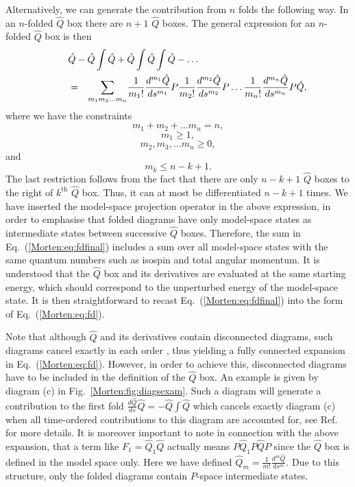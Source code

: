 Alternatively, we can generate the contribution
from $n$ folds the following way. In
an $n$-folded $\hat{Q}$ box there are $n+1$ $\hat{Q}$ boxes. The 
general expression for an $n$-folded $\hat{Q}$ box is then
\begin{eqnarray}
\lefteqn{        \hat{Q}   -\hat{Q}\int\hat{Q} 
    +\hat{Q}\int\hat{Q}\int\hat{Q} -\dots}\nonumber\\
\qquad&=&
    {\displaystyle\sum_{m_1m_2\dots m_n}}
    \frac{1}{m_1!}\frac{d^{m_1}\hat{Q}}{ds^{m_1}}P
    \frac{1}{m_2!}\frac{d^{m_2}\hat{Q}}{ds^{m_2}}P
    \dots
    \frac{1}{m_n!}\frac{d^{m_n}\hat{Q}}{ds^{m_n}}P\hat{Q},
\label{Morten:eq:fdfinal}
\end{eqnarray}
where we have the constraints
\[
  m_1+m_2+\dots m_n=n,
\]
\[
m_1\geq 1,
\]
\[
m_2, m_3, \dots m_n \geq 0,
\]
and
\[
m_k \leq n-k+1.
\]
The last restriction follows from the fact that there are only $n-k+1$
$\hat{Q}$ boxes to the right of $k^{\mathrm{th}}$ $\hat{Q}$ box.
Thus, it can at most be differentiated $n-k+1$ times.  We have
inserted the model-space projection operator in the above expression,
in order to emphasise that folded diagrams have only model-space
states as intermediate states between successive $\hat{Q}$
boxes. Therefore, the sum in Eq.~(\ref{Morten:eq:fdfinal}) includes a
sum over all model-space states with the same quantum numbers such as
isospin and total angular momentum. It is understood that the
$\hat{Q}$ box and its derivatives are evaluated at the same starting
energy, which should correspond to the unperturbed energy of the
model-space state.  It is then straightforward to recast
Eq.~(\ref{Morten:eq:fdfinal}) into the form of
Eq.~(\ref{Morten:eq:fd}).

Note that although $\hat{Q}$ and its derivatives contain disconnected
diagrams, such diagrams cancel exactly in each order \cite{Morten:ko90}, thus
yielding a fully connected expansion in Eq.~(\ref{Morten:eq:fd}).
However, in order to achieve this, disconnected diagrams have 
to be included in the definition of the $\hat{Q}$ box. An example
is given by diagram (c) in Fig.~\ref{Morten:fig:diagsexam}. 
Such a diagram will generate a contribution to 
the first fold $\frac{d\hat{Q}}{ds}\hat{Q}=-\hat{Q}\int\hat{Q} $
which cancels exactly diagram (c) when all time-ordered
contributions to this diagram are accounted for, see Ref.~
for more details. 
It is moreover important to note in connection with the above 
expansion, that a term like
$F_1= \hat{Q}_1 \hat{Q}$ actually means $P\hat{Q}_1 P\hat{Q}P$ since
the $\hat{Q}$ box is defined in the model space only. Here we have defined
$\hat{Q}_{m}=\frac{1}{m!}\frac{d^{m}\hat{Q}}
{ds^{m}}$.
Due to this structure, only the folded diagrams
contain $P$-space intermediate states.


